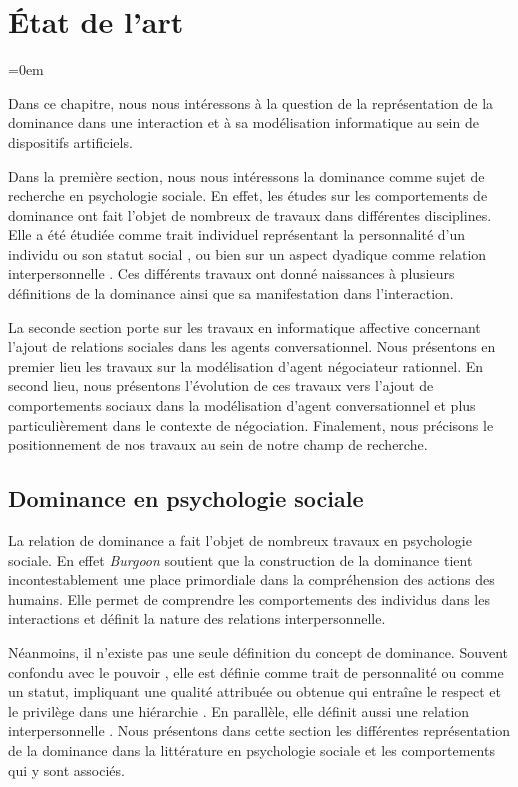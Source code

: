 \chapter{État de l'art }
\label{chap:etat}

\begingroup
\parindent=0em
\localtableofcontents 
\clearpage
\endgroup


Dans ce chapitre, nous nous intéressons à la question de la représentation de la dominance dans une interaction et à sa modélisation informatique au sein de dispositifs artificiels.

Dans la première section, nous nous intéressons la dominance comme sujet de recherche en psychologie sociale. En effet, les études sur les comportements de dominance ont fait l'objet de nombreux de travaux dans différentes disciplines. Elle a été étudiée comme trait individuel représentant la personnalité d'un individu \cite{emmons1991personal} ou son statut social \cite{liska1990dominance}, ou bien sur un aspect dyadique comme relation interpersonnelle \cite{burgoon2006nonverbal}. Ces différents travaux ont donné naissances à plusieurs définitions de la dominance ainsi que sa manifestation dans l'interaction.

La seconde section porte sur les travaux en informatique affective concernant l'ajout de relations sociales dans les agents conversationnel. Nous présentons en premier lieu les travaux sur la modélisation d'agent négociateur rationnel. En second lieu, nous présentons l'évolution de ces travaux vers l'ajout de comportements sociaux dans la modélisation d'agent conversationnel et plus particulièrement dans le contexte de négociation. Finalement, nous précisons le positionnement de nos travaux au sein de notre champ de recherche.

\section{Dominance en psychologie sociale}
	La relation de dominance a fait l'objet de nombreux travaux en psychologie sociale. En effet \emph{Burgoon} soutient que la construction de la dominance tient incontestablement une place primordiale dans la compréhension des actions des humains\cite{burgoon1995interpersonal}. Elle permet de comprendre les comportements des individus dans les interactions et définit la nature des relations interpersonnelle. 
	
	Néanmoins, il n'existe pas une seule définition du concept de dominance. Souvent confondu avec le pouvoir  \cite{burgoon2000interactionist,dunbar2005perceptions}, elle est définie comme trait de personnalité ou comme un statut, impliquant une qualité attribuée ou obtenue qui entraîne le respect et le privilège dans une hiérarchie \cite{hall2005nonverbal}. En parallèle, elle définit aussi une relation interpersonnelle \cite{burgoon2006nonverbal,burgoon1998nature}. Nous présentons dans cette section les différentes représentation de la dominance dans la littérature en psychologie sociale et les comportements qui y sont associés.  
	
